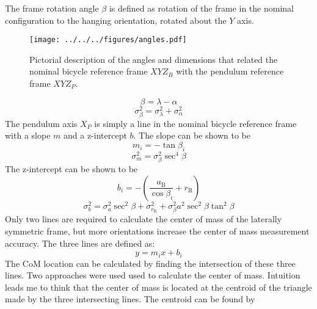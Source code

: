 \documentclass{bmd2010p}
\begin{document}
The frame rotation angle $\beta$ is defined as rotation of the frame in the
nominal configuration to the hanging orientation, rotated about the $Y$ axis.
\begin{figure}[tb]
	\begin{center}
		\texttt{[image: ../../../figures/angles.pdf]}
	\end{center}
	\caption{Pictorial description of the angles and dimensions that related
    the nominal bicycle reference frame $XYZ_B$ with the pendulum reference frame
    $XYZ_P$.}
	\label{fig:angles}
\end{figure}
\begin{equation}
	\beta=\lambda-\alpha
    \label{eq:frameRotAng}
\end{equation}
\begin{equation}
    \sigma_{\beta}^{2} = \sigma_{\lambda}^{2} + \sigma_{\alpha}^{2}
    \label{eq:FrameRotAngVar}
\end{equation}
The pendulum axis $X_P$ is simply a line in the nominal bicycle reference frame with a slope $m$ and a z-intercept $b$. The slope can be shown to be
\begin{equation}
	m_i=-\tan{\beta_i}
\label{eq:slope}
\end{equation}
\begin{equation}
    \sigma_{m}^{2} = \sigma_{\beta}^{2}\sec^{4}{\beta}
    \label{eq:SlopeVar}
\end{equation}
The z-intercept can be shown to be
\begin{equation}
    b_i=-\left(\frac{a_\mathrm{B}}{\cos{\beta_i}}+r_\mathrm{R}\right)
    \label{eq:zInt}
\end{equation}
\begin{equation}
    \sigma_{b}^{2} = \sigma_{a}^{2}\sec^{2}{\beta} +
    \sigma_{r_\mathrm{R}}^{2} +
    \sigma_{\beta}^{2}a^{2}\sec^{2}{\beta}\tan^{2}{\beta}
    \label{eq:zIntvar}
\end{equation}
Only two lines are required to calculate the center of mass of the laterally
symmetric frame, but more orientations increase the center of mass measurement
accuracy. The three lines are defined as:
\begin{equation}
   y = m_ix+b_i
   \label{eq:line}
\end{equation}
The CoM location can be calculated by finding the intersection of these three
lines. Two approaches were used used to calculate the center of mass. Intuition
leads me to think that the center of mass is located at the centroid of the
triangle made by the three intersecting lines. The centroid can be found by
\end{document}
